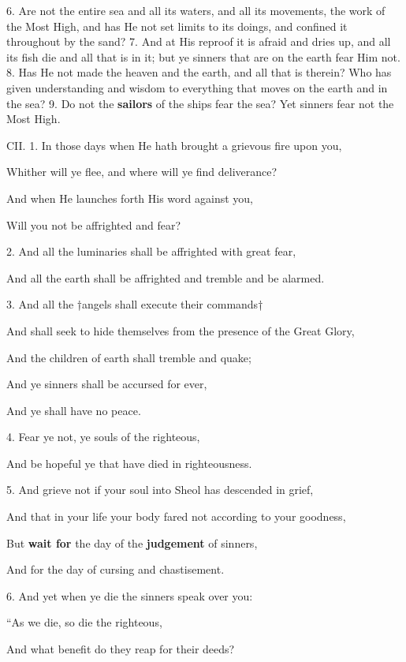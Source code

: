 6. Are not the entire sea and all its waters, and all
its movements, the work of the Most High, and has
He not set limits to its doings, and confined it throughout
by the sand? 7. And at His reproof it is afraid
and dries up, and all its fish die and all that is in it;
but ye sinners that are on the earth fear Him not.
8. Has He not made the heaven and the earth, and
all that is therein? Who has given understanding
and wisdom to everything that moves on the earth
and in the sea? 9. Do not the \textbf{sailors} of the ships
fear the sea? Yet sinners fear not the Most High.


CII. 1. In those days when He hath brought a grievous fire upon you,

Whither will ye flee, and where will ye find deliverance?

And when He launches forth His word against you,

Will you not be affrighted and fear?

2. And all the luminaries shall be affrighted with great fear,

And all the earth shall be affrighted and tremble and be alarmed.

3. And all the †angels shall execute their commands†

And shall seek to hide themselves from the presence of the Great Glory,

And the children of earth shall tremble and quake;

And ye sinners shall be accursed for ever,

And ye shall have no peace.

4. Fear ye not, ye souls of the righteous,

And be hopeful ye that have died in righteousness.

5. And grieve not if your soul into Sheol has descended in grief,

And that in your life your body fared not according to your goodness,

But \textbf{wait for} the day of the \textbf{judgement} of sinners,

And for the day of cursing and chastisement.

6. And yet when ye die the sinners speak over you:

“As we die, so die the righteous,

And what benefit do they reap for their deeds?

